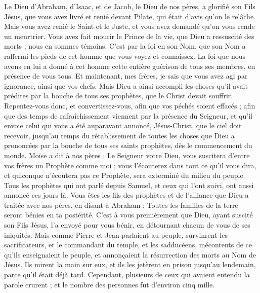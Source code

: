 \begin{multicols}{2}
Le Dieu d'Abraham, d'Isaac, et de Jacob, le Dieu de nos pères, a glorifié son Fils Jésus, que vous avez livré et renié devant Pilate, qui était d’avis qu’on le relâche.
Mais vous avez renié le Saint et le Juste, et vous avez demandé qu'on vous rende un meurtrier.
Vous avez fait mourir le Prince de la vie, que Dieu a ressuscité des morts ; nous en sommes témoins.
C’est par la foi en son Nom, que son Nom a raffermi les pieds de cet homme que vous voyez et connaissez. La foi que nous avons en lui a donné à cet homme cette entière guérison de tous ses membres, en présence de vous tous.
Et maintenant, mes frères, je sais que vous avez agi par ignorance, ainsi que vos chefs.
Mais Dieu a ainsi accompli les choses qu'il avait prédites par la bouche de tous ses prophètes, que le Christ devait souffrir.
Repentez-vous donc, et convertissez-vous, afin que vos péchés soient effacés ;
afin que des temps de rafraîchissement viennent par la présence du Seigneur, et qu'il envoie celui qui vous a été auparavant annoncé, Jésus-Christ,
que le ciel doit recevoir, jusqu'au temps du rétablissement de toutes les choses que Dieu a prononcées par la bouche de tous ses saints prophètes, dès le commencement du monde.
Moïse a dit à nos pères : Le Seigneur votre Dieu, vous suscitera d'entre vos frères un Prophète comme moi ; vous l'écouterez dans tout ce qu'il vous dira,
et quiconque n’écoutera pas ce Prophète, sera exterminé du milieu du peuple.
Tous les prophètes qui ont parlé depuis Samuel, et ceux qui l'ont suivi, ont aussi annoncé ces jours-là.
Vous êtes les fils des prophètes et de l'alliance que Dieu a traitée avec nos pères, en disant à Abraham : Toutes les familles de la terre seront bénies en ta postérité.
C'est à vous premièrement que Dieu, ayant suscité son Fils Jésus, l'a envoyé pour vous bénir, en détournant chacun de vous de ses iniquités.
\VerseOne{}Mais comme Pierre et Jean parlaient au peuple, survinrent les sacrificateurs, et le commandant du temple, et les sadducéens,
mécontents de ce qu'ils enseignaient le peuple, et annonçaient la résurrection des morts au Nom de Jésus.
Ils mirent la main sur eux, et ils les jetèrent en prison jusqu'au lendemain, parce qu'il était déjà tard.
Cependant, plusieurs de ceux qui avaient entendu la parole crurent ; et le nombre des personnes fut d'environ cinq mille.

\end{multicols}
